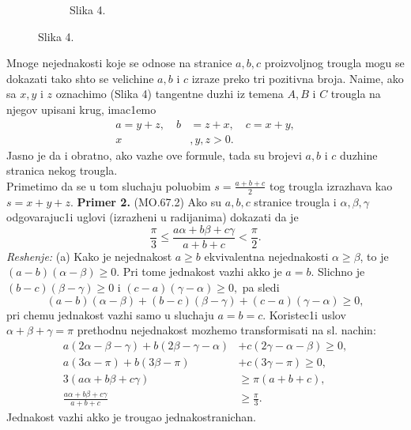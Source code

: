 \documentclass[11pt,letter]{report}
\newcommand{\D}{\displaystyle}
\begin{document}
\begin{large}
\begin{flushleft}
\begin{figure}[h!]
\begin{subfigure}{0.31\textwidth}
\caption*{Slika 4.} 
\end{subfigure}
\end{figure}
\end{flushleft}
\end{large}
\vspace{0.2cm}
\large
Mnoge nejednakosti koje se odnose na stranice $a, b, c$ proizvoljnog trougla mogu se dokazati tako shto se velichine $a,b$ i $c$ izraze preko tri pozitivna broja. Naime, ako sa $x, y$ i $z$ oznachimo
(Slika 4) tangentne duzhi iz temena $A, B$ i $C$ trougla na njegov upisani krug, imac1emo
\begin{equation}
\begin{aligned}
a=y+z,\quad b&=z+x, \quad c=x+y, \\
x&,y,z>0.   
\end{aligned}
\end{equation} 
Jasno je da i obratno, ako vazhe ove formule, tada su brojevi $a,b$ i $c$ duzhine stranica nekog trougla.\\Primetimo da se u tom sluchaju poluobim $\D s=\frac{a+b+c}{2}$ tog trougla izrazhava kao\\ $s=x+y+z.$
\newpage
\textbf{Primer 2.} (MO.67.2) Ako su $a,b,c$ stranice trougla i $\alpha,\beta,\gamma$ odgovarajuc1i uglovi (izrazheni u radijanima) dokazati da je $$\D\frac{\pi}{3}\leq\frac{a\alpha+b\beta+c\gamma}{a+b+c}<\frac{\pi}{2}.$$
\textit{Reshenje:} (a) Kako je nejednakost $a\geq b$ ekvivalentna nejednakosti $\alpha\geq\beta$, to je \\$(a-b)(\alpha-\beta)\geq0$. Pri tome jednakost vazhi akko je $a=b.$ Slichno je $(b-c)(\beta-\gamma)\geq0$ i $(c-a)(\gamma-\alpha)\geq0,$ pa sledi $$(a-b)(\alpha-\beta)+(b-c)(\beta-\gamma)+(c-a)(\gamma-\alpha)\geq0,$$ pri chemu jednakost vazhi samo u sluchaju $a=b=c.$ 
Koristec1i uslov $\alpha+\beta+\gamma=\pi$ prethodnu nejednakost mozhemo transformisati na sl. nachin:
\begin{equation*}
\begin{aligned}
a(2\alpha-\beta-\gamma)+b(2\beta-\gamma-\alpha)&+c(2\gamma-\alpha-\beta)\geq0,\\
a(3\alpha-\pi)+b(3\beta-\pi)&+c(3\gamma-\pi)\geq0,\\
3(a\alpha+b\beta+c\gamma)&\geq\pi(a+b+c),\\
\D\frac{a\alpha+b\beta+c\gamma}{a+b+c}&\geq\frac{\pi}{3}.
\end{aligned}
\end{equation*}
Jednakost vazhi akko je trougao jednakostranichan.
\end{document}
